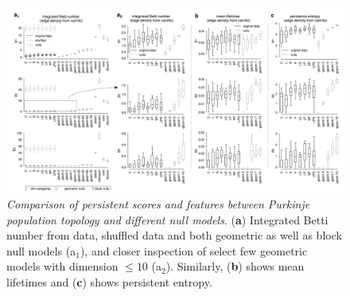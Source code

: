 \begin{figure}[H]
    \centering
    \includegraphics[width=\textwidth,center]{../figures/report/Fig4.png}
    \caption{\label{fig:4}
    \textit{Comparison of persistent scores and features between Purkinje population topology and different null models}.
    (\textbf{a}) Integrated Betti number from data, shuffled data and both geometric as well as block null models (a$_1$), and closer inspection of select few geometric models with dimension $\le 10$ (a$_2$).
    Similarly, (\textbf{b}) shows mean lifetimes and (\textbf{c}) shows persistent entropy.
    }
\end{figure}